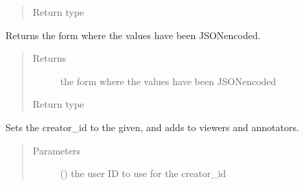 \documentclass[letterpaper,10pt,english]{sphinxmanual}
\begin{document}
\begin{fulllineitems}
\begin{fulllineitems}
\begin{quote}
\begin{description}
\item[{Return type}] \leavevmode
{}

\end{description}\end{quote}

\end{fulllineitems}


\begin{fulllineitems}
\label{\detokenize{autoapi/pine/client/models/index:pine.client.models.CollectionBuilder.form_json}}
Returns the form where the values have been JSON\sphinxhyphen{}encoded.
\begin{quote}\begin{description}
\item[{Returns}] \leavevmode
the form where the values have been JSON\sphinxhyphen{}encoded

\item[{Return type}] \leavevmode
{}

\end{description}\end{quote}

\end{fulllineitems}


\begin{fulllineitems}
\label{\detokenize{autoapi/pine/client/models/index:pine.client.models.CollectionBuilder.creator_id}}
Sets the creator\_id to the given, and adds to viewers and annotators.
\begin{quote}\begin{description}
\item[{Parameters}] \leavevmode
{} () \textendash{} the user ID to use for the creator\_id


\end{description}
\end{quote}
\end{fulllineitems}
\end{fulllineitems}
\end{document}
